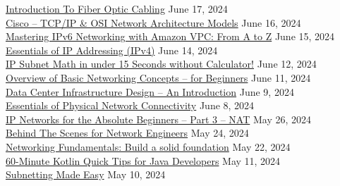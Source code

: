 \documentclass[10pt]{res} %
\begin{document}
\begin{resume}
\href{https://www.udemy.com/certificate/UC-68240b15-9190-49c3-b3c0-cabf9c9527c6}{\color{blue}Introduction To Fiber Optic Cabling} \hfill June 17, 2024 \\
\href{https://www.udemy.com/certificate/UC-1f8de3e7-e4fc-4d14-86f5-654a9f9bef8f}{\color{blue}Cisco -- TCP/IP \& OSI Network Architecture Models} \hfill June 16, 2024 \\
\href{https://www.udemy.com/certificate/UC-33713610-40a2-48cc-a5b1-f4d7c69f04bf}{\color{blue}Mastering IPv6 Networking with Amazon VPC: From A to Z} \hfill June 15, 2024 \\
\href{https://www.udemy.com/certificate/UC-e4aab58f-6d93-4474-92f1-0acf19498ebc}{\color{blue}Essentials of IP Addressing (IPv4)} \hfill June 14, 2024 \\
\href{https://www.udemy.com/certificate/UC-07f87060-9cd5-4b9f-889d-0254b106449d}{\color{blue}IP Subnet Math in under 15 Seconds without Calculator!} \hfill June 12, 2024 \\
\href{https://www.udemy.com/certificate/UC-1f08b3f2-d2cb-45d6-8cd1-3b3ba44182d5}{\color{blue}Overview of Basic Networking Concepts -- for Beginners} \hfill June 11, 2024 \\
\href{https://www.udemy.com/certificate/UC-b5aafa66-ea96-4777-9e3d-1b4b0253bf50}{\color{blue}Data Center Infrastructure Design -- An Introduction} \hfill June 9, 2024 \\
\href{https://www.udemy.com/certificate/UC-c97e9285-d452-4651-bfe1-0a6a53c0deeb}{\color{blue}Essentials of Physical Network Connectivity} \hfill June 8, 2024 \\
\href{https://www.udemy.com/certificate/UC-35149a66-deec-418a-9819-c52e85ac5e19}{\color{blue}IP Networks for the Absolute Beginners -- Part 3 -- NAT} \hfill May 26, 2024 \\
\href{https://www.udemy.com/certificate/UC-30b0c3d2-7a48-441b-ad8a-ed179f8fc994}{\color{blue}Behind The Scenes for Network Engineers} \hfill May 24, 2024 \\
\href{https://www.udemy.com/certificate/UC-53bc7b14-7e87-4b49-b3cf-9b984d6c0f4b}{\color{blue}Networking Fundamentals: Build a solid foundation} \hfill May 22, 2024 \\
\href{https://www.udemy.com/certificate/UC-dd1c43dc-b363-4e84-a7d0-416067a87159}{\color{blue}60-Minute Kotlin Quick Tips for Java Developers} \hfill May 11, 2024 \\
\href{https://www.udemy.com/certificate/UC-f9017a63-57bd-4145-aaae-90ca7b0c6bd5}{\color{blue}Subnetting Made Easy} \hfill May 10, 2024 \\

\end{resume}
\end{document}
